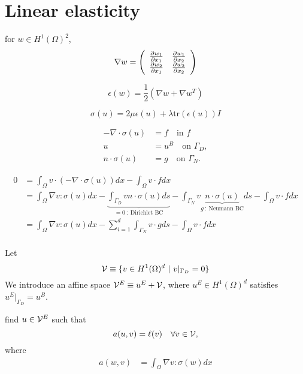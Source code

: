 \chapter{Linear elasticity}



for $w \in H^1(\Omega)^2$, 
\begin{equation*}
  \nabla w = \bmat{cc}
  \pp{w_1}{x_1} & \pp{w_1}{x_2} \\
  \pp{w_2}{x_1} & \pp{w_2}{x_2}
  \emat
\end{equation*}


\begin{equation*}
  \epsilon(w) = \frac{1}{2} (\nabla w + \nabla w^T)
\end{equation*}

\begin{equation*}
  \sigma(u) = 2 \mu \epsilon(u) + \lambda \text{tr}(\epsilon(u)) I
\end{equation*}

\begin{align*}
  - \nabla \cdot \sigma(u) &= f \quad \text{in } f \\
  u &= u^B \quad \text{on } \Gamma_{D}, \\
  n \cdot \sigma(u) &= g \quad \text{on } \Gamma_{N}.
\end{align*}

\begin{align*}
  0 &= 
  \int_{\Omega} v \cdot (-\nabla \cdot \sigma(u) ) dx - \int_{\Omega} v \cdot f dx \\
  &=
  \int_{\Omega} \nabla v : \sigma (u) dx - \underbrace{ \int_{\Gamma_D} v n \cdot \sigma(u) ds}_{= 0 \ : \ \text{Dirichlet BC}} - \int_{\Gamma_{N}} v \underbrace{ n \cdot \sigma(u)}_{g \ : \ \text{Neumann BC}} ds - \int_{\Omega} v \cdot f dx \\
  &=
  \int_{\Omega} \nabla v : \sigma (u) dx - \sum_{i=1}^d \int_{\Gamma_N} v \cdot g ds - \int_{\Omega} v \cdot f dx \\
\end{align*}

Let
\begin{equation*}
  \calV \equiv \{ v \in H^1(\Omega)^d \ | \ v|_{\Gamma_D} = 0 \}
\end{equation*}
We introduce an affine space $\calV^E \equiv u^E + \calV$, where $u^E \in H^1(\Omega)^d$ satisfies $u^E|_{\Gamma_D} = u^B$.

find $u \in \calV^E$ such that
\begin{equation*}
  a(u,v) = \ell(v) \quad \forall v \in \calV,
\end{equation*}
where
\begin{align*}
  a(w,v) &= \int_{\Omega} \nabla v : \sigma (w) dx 
\end{align*}
